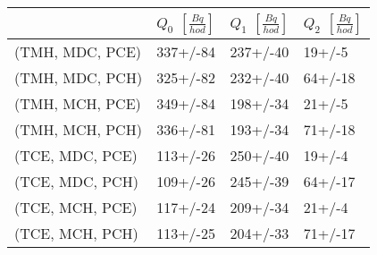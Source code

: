 \begin{tabular}{llll}
\toprule
{} & $Q_0$ $\left[\si{\frac{Bq}{hod}}\right]$ & $Q_1$ $\left[\si{\frac{Bq}{hod}}\right]$ & $Q_2$ $\left[\si{\frac{Bq}{hod}}\right]$ \\
\midrule
(TMH, MDC, PCE) &                                 337+/-84 &                                 237+/-40 &                                   19+/-5 \\
(TMH, MDC, PCH) &                                 325+/-82 &                                 232+/-40 &                                  64+/-18 \\
(TMH, MCH, PCE) &                                 349+/-84 &                                 198+/-34 &                                   21+/-5 \\
(TMH, MCH, PCH) &                                 336+/-81 &                                 193+/-34 &                                  71+/-18 \\
(TCE, MDC, PCE) &                                 113+/-26 &                                 250+/-40 &                                   19+/-4 \\
(TCE, MDC, PCH) &                                 109+/-26 &                                 245+/-39 &                                  64+/-17 \\
(TCE, MCH, PCE) &                                 117+/-24 &                                 209+/-34 &                                   21+/-4 \\
(TCE, MCH, PCH) &                                 113+/-25 &                                 204+/-33 &                                  71+/-17 \\
\bottomrule
\end{tabular}
